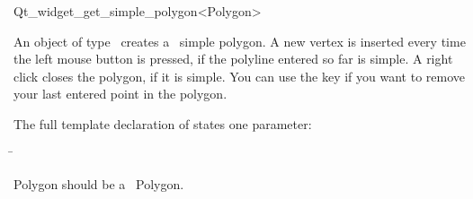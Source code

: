 
\begin{ccRefClass}{Qt_widget_get_simple_polygon<Polygon>}

\ccDefinition
An object of type \ccRefName\ creates a \cgal\ simple polygon.
A new vertex is inserted every time the left mouse button is pressed, if the 
polyline entered so far is simple. A right click closes the polygon, if
it is simple. You can use the  key if you want to remove
your last entered point in the polygon.


\ccParameters

The full template declaration of  states one parameter:

\begin{tabbing}
 \=\\
\end{tabbing}

Polygon should be a \cgal\ Polygon.

\ccInheritsFrom
{}
\ccGlue

\ccCreation
{}


\end{ccRefClass}








